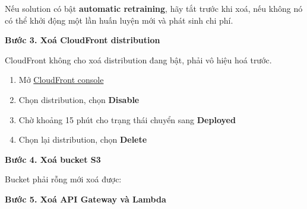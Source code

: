 Nếu solution có bật \textbf{automatic retraining}, hãy tắt trước khi
xoá, nếu không nó có thể khởi động một lần huấn luyện mới và phát sinh
chi phí.

\vspace{0.5em}\noindent\textbf{Bước 3. Xoá CloudFront
distribution}\par

CloudFront không cho xoá distribution đang bật, phải vô hiệu hoá trước.

\begin{enumerate}
\def\labelenumi{\arabic{enumi}.}
\tightlist
\item
  Mở \href{https://console.aws.amazon.com/cloudfront/v4/home}{CloudFront
  console}
\item
  Chọn distribution, chọn \textbf{Disable}
\item
  Chờ khoảng 15 phút cho trạng thái chuyển sang \textbf{Deployed}
\item
  Chọn lại distribution, chọn \textbf{Delete}
\end{enumerate}

\vspace{0.5em}\noindent\textbf{Bước 4. Xoá bucket
S3}\par

Bucket phải rỗng mới xoá được:

\begin{Shaded}
\begin{Highlighting}[]
\OperatorTok{\textless{}}\OperatorTok{\textgreater{}}
\OperatorTok{\textless{}}\OperatorTok{\textgreater{}}

\OperatorTok{\textless{}}\OperatorTok{\textgreater{}}
\OperatorTok{\textless{}}\OperatorTok{\textgreater{}}
\end{Highlighting}
\end{Shaded}

\vspace{0.5em}\noindent\textbf{Bước 5. Xoá API Gateway và
Lambda}\par

\begin{Shaded}
\begin{Highlighting}[]
 \OperatorTok{\textless{}}\OperatorTok{\textgreater{}}
\end{Highlighting}
\end{Shaded}


